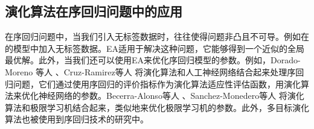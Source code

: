 \subsection{演化算法在序回归问题中的应用}

在序回归问题中，当我们引入无标签数据时，往往使得问题非凸且不可导。例如在\citep{chu2005new}\citep{sun2010kernel}的模型中加入无标签数据。EA适用于解决这种问题，它能够得到一个近似的全局最优解。此外，当我们还可以使用EA来优化序回归模型的参数。例如，Dorado-Moreno 等人\citep{dorado2012ordinal}
、Cruz-Ramirez等人\citep{cruz2014metrics}\citep{cruz2013multiobjective}
将演化算法和人工神经网络结合起来处理序回归问题，它们通过使用序回归的评价指标作为演化算法适应性评估函数，用演化算法来优化神经网络的参数。Becerra-Alonso等人\citep{becerra2012evolutionary}
、Sanchez-Monedero等人\citep{sanchez2013evolutionary}
将演化算法和极限学习机结合起来，类似地来优化极限学习机的参数。此外，多目标演化算法\citep{deb2001multi}也被使用到序回归技术的研究中\citep{cruz2013multiobjective}\citep{cruz2014metrics}。


